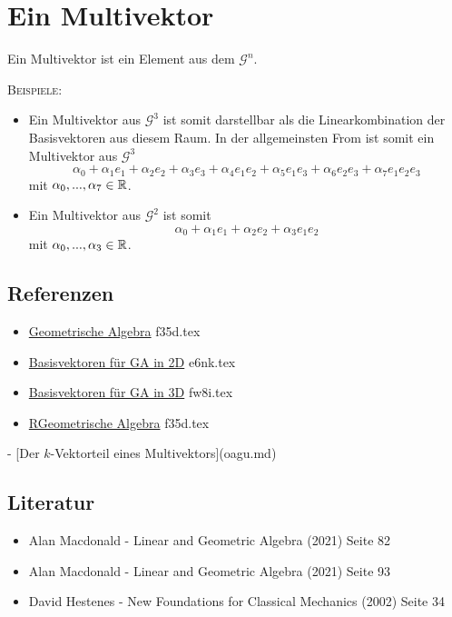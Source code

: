 \documentclass{sajzk}
\begin{document}
\section{Ein Multivektor}
\label{d1fv}
Ein Multivektor ist ein Element aus dem $\mathscr{G}^n$.

\textsc{Beispiele:}
\begin{itemize}
  \item Ein Multivektor aus $\mathscr{G}^3$ ist somit darstellbar als die
  Linearkombination der Basisvektoren aus diesem Raum. In der allgemeinsten From
  ist somit ein Multivektor aus $\mathscr{G}^3$
  \[
  \alpha_0 + \alpha_1 e_1 + \alpha_2 e_2 + \alpha_3 e_3 + \alpha_4 e_1e_2 + \alpha_5 e_1e_3 + \alpha_6 e_2e_3 + \alpha_7 e_1e_2e_3
  \]
  mit $\alpha_0, ...,\alpha_7\in\mathbb{R}$.
  \item Ein Multivektor aus $\mathscr{G}^2$ ist somit
  \[
  \alpha_0 + \alpha_1 e_1 + \alpha_2 e_2 + \alpha_3 e_1e_2
  \]
  mit $\alpha_0, ...,\alpha_3\in\mathbb{R}$.
\end{itemize}

\subsection{Referenzen}
\begin{itemize}
    \item \href{f35d.pdf}{Geometrische Algebra} f35d.tex
    \item \href{e6nk.pdf}{Basisvektoren für GA in 2D} e6nk.tex
    \item \href{fw8i.pdf}{Basisvektoren für GA in 3D} fw8i.tex
    \item \href{f35d.pdf}{RGeometrische Algebra} f35d.tex
\end{itemize}
- [Der $k$-Vektorteil eines Multivektors](oagu.md)

\subsection{Literatur}
\begin{itemize}
    \item Alan Macdonald - Linear and Geometric Algebra (2021) Seite 82
    \item Alan Macdonald - Linear and Geometric Algebra (2021) Seite 93
    \item David Hestenes - New Foundations for Classical Mechanics (2002) Seite 34
\end{itemize}
\end{document}

